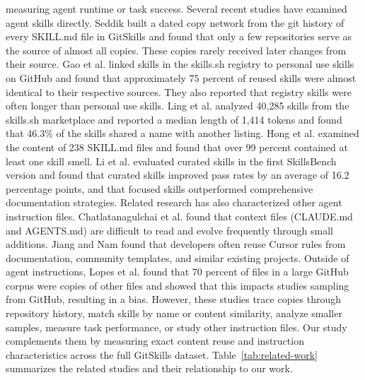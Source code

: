 \documentclass[sigconf,review]{acmart}
\begin{document}
measuring agent runtime or task success. Several recent studies have examined agent skills directly. Seddik \cite{seddik2026constellations} built a dated copy network from the git history of every SKILL.md file in GitSkills and found that only a few repositories serve as the source of almost all copies. These copies rarely received later changes from their source. Gao et al. \cite{gao2026registry} linked skills in the skills.sh registry to personal use skills on GitHub and found that approximately 75 percent of reused skills were almost identical to their respective sources. They also reported that registry skills were often longer than personal use skills. Ling et al. \cite{ling2026agentskills} analyzed 40,285 skills from the skills.sh marketplace and reported a median length of 1,414 tokens and found that 46.3\% of the skills shared a name with another listing. Hong et al. \cite{hong2026smells} examined the content of 238 SKILL.md files and found that over 99 percent contained at least one skill smell. Li et al. \cite{li2026skillsbench} evaluated curated skills in the first SkillsBench version and found that curated skills improved pass rates by an average of 16.2 percentage points, and that focused skills outperformed comprehensive documentation strategies. Related research has also characterized other agent instruction files. Chatlatanagulchai et al. \cite{chatlatanagulchai2025agentreadmes} found that context files (CLAUDE.md and AGENTS.md) are difficult to read and evolve frequently through small additions. Jiang and Nam \cite{jiang2026cursorrules} found that developers often reuse Cursor rules from documentation, community templates, and similar existing projects. Outside of agent instructions, Lopes et al. \cite{lopes2017dejavu} found that 70 percent of files in a large GitHub corpus were copies of other files and showed that this impacts studies sampling from GitHub, resulting in a bias. However, these studies trace copies through repository history, match skills by name or content similarity, analyze smaller samples, measure task performance, or study other instruction files. Our study complements them by measuring exact content reuse and instruction characteristics across the full GitSkills dataset. Table~\ref{tab:related-work} summarizes the related studies
and their relationship to our work.


\end{document}

